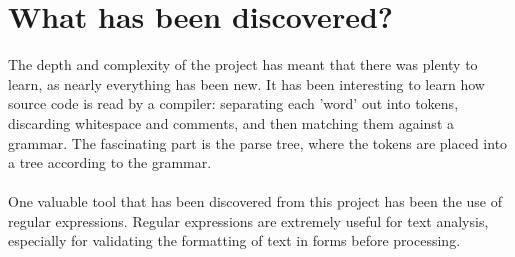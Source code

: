 \documentclass[12pt]{report}
\begin{document}
\section{What has been discovered?}\label{sec:conc:discovered}
The depth and complexity of the project has meant that there was plenty to learn, as nearly everything has been new.  It has been interesting to learn how source code is read by a compiler: separating each 'word' out into tokens, discarding whitespace and comments, and then matching them against a grammar.  The fascinating part is the parse tree, where the tokens are placed into a tree according to the grammar.
\\
\\
One valuable tool that has been discovered from this project has been the use of regular expressions.  Regular expressions are extremely useful for text analysis, especially for validating the formatting of text in forms before processing.
\end{document}
